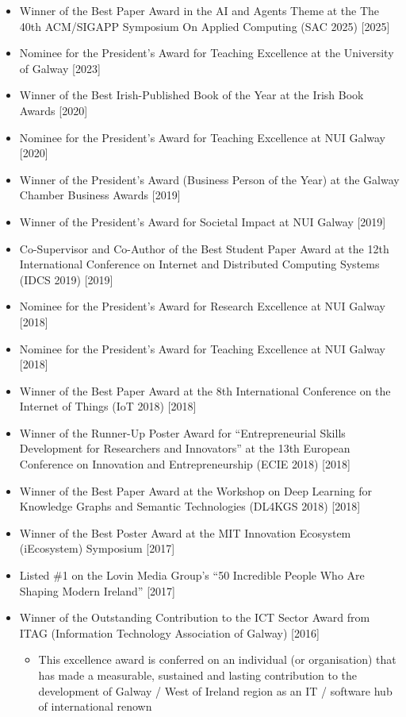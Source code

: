 \documentclass[10pt,a4paper]{res} %
\begin{document}
\begin{resume}
\begin{itemize} \itemsep -2pt
\item Winner of the Best Paper Award in the AI and Agents Theme at the The 40th ACM/SIGAPP Symposium On Applied Computing (SAC 2025) [2025]
\item Nominee for the President's Award for Teaching Excellence at the University of Galway [2023]
\item Winner of the Best Irish-Published Book of the Year at the Irish Book Awards [2020]
\item Nominee for the President's Award for Teaching Excellence at NUI Galway [2020]
\item Winner of the President's Award (Business Person of the Year) at the Galway Chamber Business Awards [2019]
\item Winner of the President's Award for Societal Impact at NUI Galway [2019]
\item Co-Supervisor and Co-Author of the Best Student Paper Award at the 12th International Conference on Internet and Distributed Computing Systems (IDCS 2019) [2019]
\item Nominee for the President's Award for Research Excellence at NUI Galway [2018]
\item Nominee for the President's Award for Teaching Excellence at NUI Galway [2018]
\item Winner of the Best Paper Award at the 8th International Conference on the Internet of Things (IoT 2018) [2018]
\item Winner of the Runner-Up Poster Award for ``Entrepreneurial Skills Development for Researchers and Innovators'' at the 13th European Conference on Innovation and Entrepreneurship (ECIE 2018) [2018]
\item Winner of the Best Paper Award at the Workshop on Deep Learning for Knowledge Graphs and Semantic Technologies (DL4KGS 2018) [2018]
\item Winner of the Best Poster Award at the MIT Innovation Ecosystem (iEcosystem) Symposium [2017]
\item Listed \#1 on the Lovin Media Group's ``50 Incredible People Who Are Shaping Modern Ireland'' [2017]
\item Winner of the Outstanding Contribution to the ICT Sector Award from ITAG (Information Technology Association of Galway) [2016]
\begin{itemize} \itemsep -2pt
\item This excellence award is conferred on an individual (or organisation) that has made a measurable, sustained and lasting contribution to the development of Galway / West of Ireland region as an IT / software hub of international renown

\end{itemize}
\end{itemize}
\end{resume}
\end{document}
